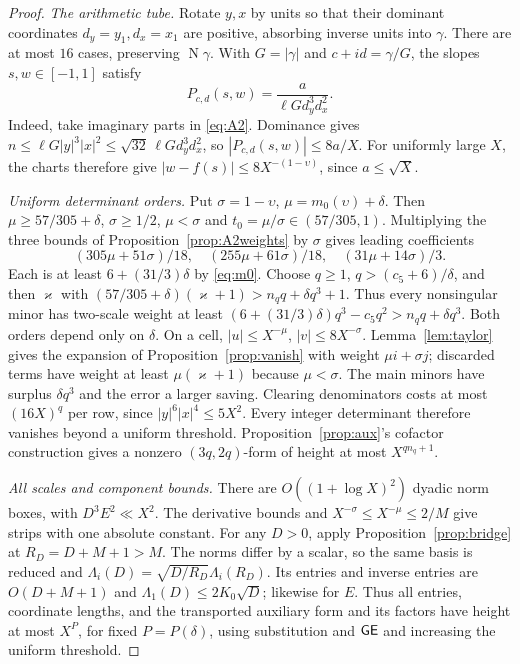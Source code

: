 \documentclass[11pt,reqno]{amsart}
\theoremstyle{definition}
\theoremstyle{remark}
\numberwithin{equation}{section}
\newcommand{\Nm}{\operatorname{N}}
\begin{document}
\begin{proof}
\emph{The arithmetic tube.}
Rotate $y,x$ by units so that their dominant coordinates
$d_y=y_1,d_x=x_1$ are positive, absorbing inverse units into
$\gamma$. There are at most $16$ cases, preserving $\Nm\gamma$.
With $G=|\gamma|$ and $c+id=\gamma/G$, the slopes $s,w\in[-1,1]$
satisfy
\begin{equation}\label{eq:A2normalizedtube}
 P_{c,d}(s,w)=\frac{a}{\ell Gd_y^3d_x^2}.
\end{equation}
Indeed, take imaginary parts in \eqref{eq:A2}. Dominance gives
$n\le\ell G|y|^3|x|^2\le\sqrt{32}\,\ell Gd_y^3d_x^2$,
so $|P_{c,d}(s,w)|\le8a/X$. For uniformly large $X$, the charts
therefore give $|w-f(s)|\le8X^{-(1-\upsilon)}$, since $a\le\sqrt X$.

\emph{Uniform determinant orders.}
Put $\sigma=1-\upsilon$, $\mu=m_0(\upsilon)+\delta$.
Then $\mu\ge57/305+\delta$, $\sigma\ge1/2$, $\mu<\sigma$ and
$t_0=\mu/\sigma\in(57/305,1)$. Multiplying the three bounds of
Proposition~\ref{prop:A2weights} by $\sigma$ gives leading coefficients
\[
 (305\mu+51\sigma)/18,\quad(255\mu+61\sigma)/18,\quad
 (31\mu+14\sigma)/3.
\]
Each is at least $6+(31/3)\delta$ by \eqref{eq:m0}.
Choose $q\ge1$, $q>(c_5+6)/\delta$, and then $\varkappa$ with
$(57/305+\delta)(\varkappa+1)>n_qq+\delta q^3+1$.
Thus every nonsingular minor has two-scale weight at least
$(6+(31/3)\delta)q^3-c_5q^2>n_qq+\delta q^3$.
Both orders depend only on $\delta$.
On a cell, $|u|\le X^{-\mu}$, $|v|\le8X^{-\sigma}$.
Lemma~\ref{lem:taylor} gives the expansion of
Proposition~\ref{prop:vanish} with weight $\mu i+\sigma j$;
discarded terms have weight at least $\mu(\varkappa+1)$ because
$\mu<\sigma$. The main minors have surplus $\delta q^3$ and
the error a larger saving. Clearing denominators costs at most
$(16X)^q$ per row, since $|y|^6|x|^4\le5X^2$.
Every integer determinant therefore vanishes beyond a uniform
threshold. Proposition~\ref{prop:aux}'s cofactor construction gives
a nonzero $(3q,2q)$-form of height at most $X^{qn_q+1}$.

\emph{All scales and component bounds.}
There are $O((1+\log X)^2)$ dyadic norm boxes, with $D^3E^2\ll X^2$.
The derivative bounds and $X^{-\sigma}\le X^{-\mu}\le2/M$
give strips with one absolute constant. For any $D>0$, apply
Proposition~\ref{prop:bridge} at $R_D=D+M+1>M$.
The norms differ by a scalar, so the same basis is reduced and
$\Lambda_i(D)=\sqrt{D/R_D}\Lambda_i(R_D)$.
Its entries and inverse entries are $O(D+M+1)$ and
$\Lambda_1(D)\le2K_0\sqrt D$; likewise for $E$.
Thus all entries, coordinate lengths, and the transported auxiliary
form and its factors have height at most $X^P$, for fixed $P=P(\delta)$,
using substitution and $\mathsf{GE}$ and increasing the uniform threshold.


\end{proof}
\end{document}
